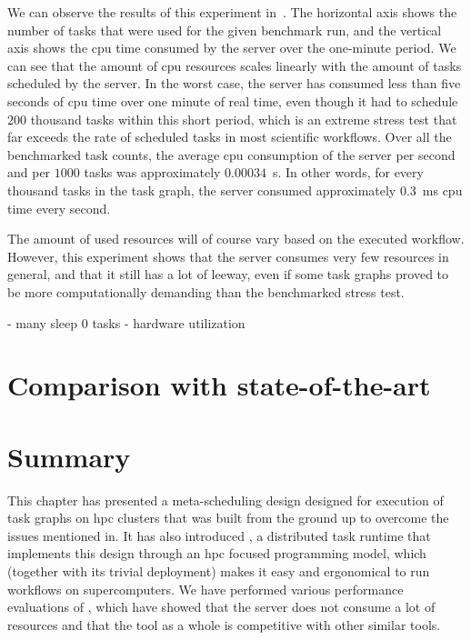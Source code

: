 We can observe the results of this experiment in~. The horizontal axis shows
the number of tasks that were used for the given benchmark run, and the vertical axis shows the
\gls{cpu} time consumed by the server over the one-minute period. We can see that the
amount of \gls{cpu} resources scales linearly with the amount of tasks scheduled by
the server. In the worst case, the server has consumed less than five seconds of
\gls{cpu} time over one minute of real time, even though it had to schedule
$200$ thousand tasks within this short period, which is an extreme stress test that
far exceeds the rate of scheduled tasks in most scientific workflows. Over all the benchmarked task
counts, the average \gls{cpu} consumption of the server per second and per
$1000$ tasks was approximately $0.00034$~s. In other words, for every
thousand tasks in the task graph, the server consumed approximately $0.3$~ms
\gls{cpu} time every second.

The amount of used resources will of course vary based on the executed workflow. However, this
experiment shows that the server consumes very few resources in general, and that it still has a
lot of leeway, even if some task graphs proved to be more computationally demanding than the
benchmarked stress test.

- many sleep 0 tasks
- hardware utilization

\section{Comparison with state-of-the-art}

\section*{Summary}
This chapter has presented a meta-scheduling design designed for execution of task graphs on
\gls{hpc} clusters that was built from the ground up to overcome the issues mentioned
in. It has also introduced \hyperqueue{}, a distributed task
runtime that implements this design through an \gls{hpc} focused programming model,
which (together with its trivial deployment) makes it easy and ergonomical to run workflows on
supercomputers.  We have performed various performance evaluations%
of \hyperqueue{}, which have showed that the server does not consume a lot of resources
and that the tool as a whole is competitive with other similar tools.

